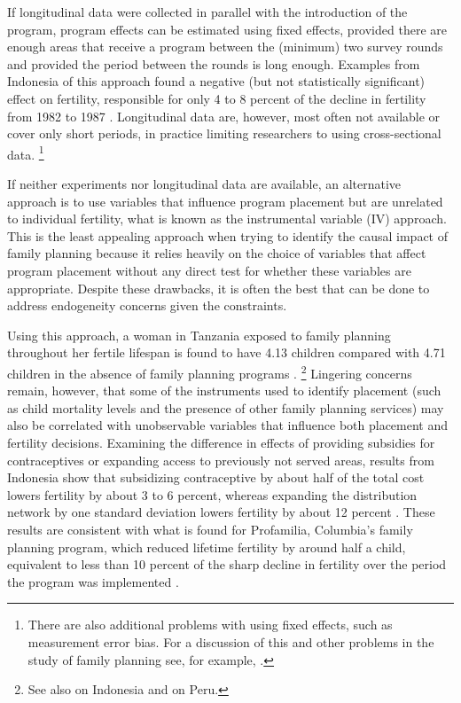 \documentclass[letterpaper,12pt]{article}
\begin{document}
If longitudinal data were collected in parallel with the introduction of
the program, program effects can be estimated using fixed effects,
provided there are enough areas that receive a program between the
(minimum) two survey rounds and provided the period between the rounds
is long enough. 
Examples from Indonesia of this approach found a negative (but not
statistically significant) effect on fertility, responsible for only 4
to 8 percent of the decline in fertility from 1982 to 1987
\citep{pitt93,Gertler1994}. 
Longitudinal data are, however, most often not available or cover only
short periods, in practice limiting researchers to using cross-sectional
data.%
\footnote{
There are also additional problems with using fixed effects, such as
measurement error bias. 
For a discussion of this and other problems in the study of family
planning see, for example, \cite{angeles98}.}

If neither experiments nor longitudinal data are available, an
alternative approach is to use variables that influence program
placement but are unrelated to individual fertility, what is known as
the instrumental variable (IV) approach. 
This is the least appealing approach when trying to identify the causal
impact of family planning because it relies heavily on the choice of
variables that affect program placement without any direct test for
whether these variables are appropriate. 
Despite these drawbacks, it is often the best that can be done to
address endogeneity concerns given the constraints.

Using this approach, a woman in Tanzania exposed to family planning
throughout her fertile lifespan is found to have 4.13 children compared
with 4.71 children in the absence of family planning programs
\citep{angeles98}.%
\footnote{
See also \citet{Angeles2005} on Indonesia and \citep{Angeles2005a} on
Peru.} 
Lingering concerns remain, however, that some of the instruments used to
identify placement (such as child mortality levels and the presence of
other family planning services) may also be correlated with unobservable
variables that influence both placement and fertility decisions. 
Examining the difference in effects of providing subsidies for
contraceptives or expanding access to previously not served areas,
results from Indonesia show that subsidizing contraceptive by about half
of the total cost lowers fertility by about 3 to 6 percent, whereas
expanding the distribution network by one standard deviation lowers
fertility by about 12 percent \citep{Molyneaux2000}. 
These results are consistent with what is found for Profamilia,
Columbia's family planning program, which reduced lifetime fertility by
around half a child, equivalent to less than 10 percent of the sharp
decline in fertility over the period the program was implemented
\citep{Miller2010}.
\end{document}
